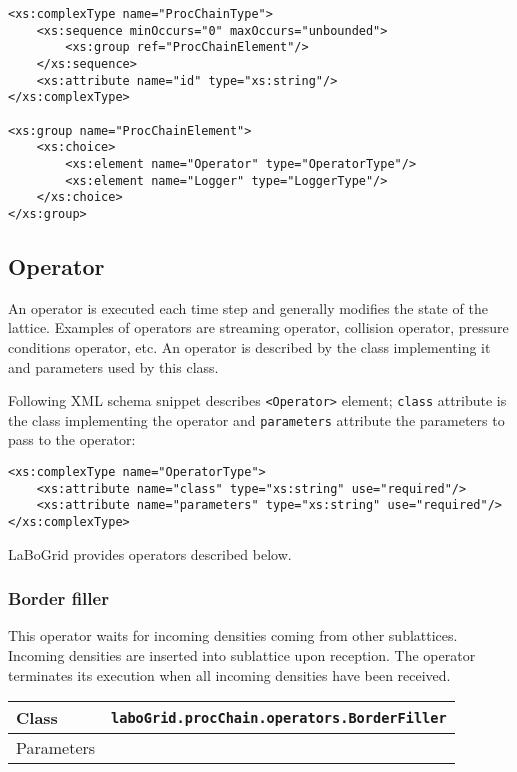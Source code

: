 \begin{Verbatim}[tabsize=2,frame=lines]
<xs:complexType name="ProcChainType">
	<xs:sequence minOccurs="0" maxOccurs="unbounded">
		<xs:group ref="ProcChainElement"/>
	</xs:sequence>
	<xs:attribute name="id" type="xs:string"/>
</xs:complexType>

<xs:group name="ProcChainElement">
	<xs:choice>
		<xs:element name="Operator" type="OperatorType"/>
		<xs:element name="Logger" type="LoggerType"/>
	</xs:choice>
</xs:group>
\end{Verbatim}


\subsection{Operator}
\label{sec_conf_proc_op}

An operator is executed each time step and generally modifies the state of the
lattice. Examples of operators are streaming operator, collision operator,
pressure conditions operator, etc. An operator is described by the class
implementing it and parameters used by this class.

Following XML schema snippet describes \verb|<Operator>| element;
\texttt{class} attribute is the class implementing the operator and
\texttt{parameters} attribute the parameters to pass to the operator:

\begin{Verbatim}[tabsize=2,frame=lines]
<xs:complexType name="OperatorType">
	<xs:attribute name="class" type="xs:string" use="required"/>
	<xs:attribute name="parameters" type="xs:string" use="required"/>
</xs:complexType>
\end{Verbatim}

LaBoGrid provides operators described below.


\subsubsection{Border filler}

This operator waits for incoming densities coming from other sublattices.
Incoming densities are inserted into sublattice upon reception. The operator
terminates its execution when all incoming densities have been received.

\noindent
\begin{tabular}{|p{1.7cm}|p{9.55cm}|}
\hline
Class & \texttt{laboGrid.procChain.operators.BorderFiller}\\
\hline
Parameters & \\
\hline
\end{tabular}


